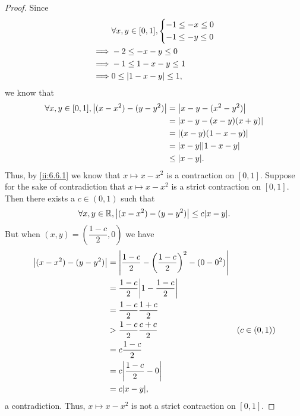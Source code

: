 \begin{proof}
  Since
  \begin{align*}
             & \forall x, y \in [0, 1], \begin{dcases}
                                          -1 \leq -x \leq 0 \\
                                          -1 \leq -y \leq 0
                                        \end{dcases} \\
    \implies & -2 \leq -x - y \leq 0                      \\
    \implies & -1 \leq 1 - x - y \leq 1                   \\
    \implies & 0 \leq \left\lvert1 - x - y\right\rvert \leq 1,
  \end{align*}
  we know that
  \begin{align*}
    \forall x, y \in [0, 1], \abs{(x - x^2) - (y - y^2)} & = \abs{x - y - (x^2 - y^2)}    \\
                                                         & = \abs{x - y - (x - y)(x + y)} \\
                                                         & = \abs{(x - y)(1 - x - y)}     \\
                                                         & = \abs{x - y} \abs{1 - x - y}  \\
                                                         & \leq \abs{x - y}.
  \end{align*}
  Thus, by \cref{ii:6.6.1} we know that \(x \mapsto x - x^2\) is a contraction on \([0, 1]\).
  Suppose for the sake of contradiction that \(x \mapsto x - x^2\) is a strict contraction on \([0, 1]\).
  Then there exists a \(c \in (0, 1)\) such that
  \[
    \forall x, y \in \R, \abs{(x - x^2) - (y - y^2)} \leq c \abs{x - y}.
  \]
  But when \((x, y) = (\dfrac{1 - c}{2}, 0)\) we have
  \begin{align*}
    \abs{(x - x^2) - (y - y^2)} & = \abs{\dfrac{1 - c}{2} - \bigg(\dfrac{1 - c}{2}\bigg)^2 - (0 - 0^2)}                  \\
                                & = \dfrac{1 - c}{2} \abs{1 - \dfrac{1 - c}{2}}                                          \\
                                & = \dfrac{1 - c}{2} \dfrac{1 + c}{2}                                                    \\
                                & > \dfrac{1 - c}{2} \dfrac{c + c}{2}                                   & (c \in (0, 1)) \\
                                & = c \dfrac{1 - c}{2}                                                                   \\
                                & = c \abs{\dfrac{1 - c}{2} - 0}                                                         \\
                                & = c \abs{x - y},
  \end{align*}
  a contradiction.
  Thus, \(x \mapsto x - x^2\) is not a strict contraction on \([0, 1]\).
\end{proof}

